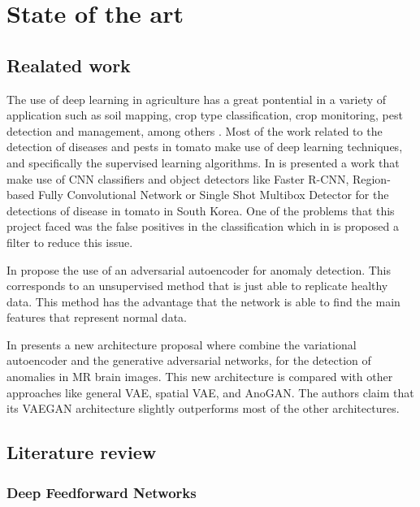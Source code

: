 \chapter{State of the art}
\label{ch:marco}

\section{Realated work}

The use of deep learning in agriculture has a great pontential in a variety of application such as soil mapping, crop type classification, crop monitoring, pest detection and management, among others \cite{Kamilaris}. Most of the work related to the detection of diseases and pests in tomato make use of deep learning techniques, and specifically the supervised learning algorithms. In \cite{Fuentes2017_2} is presented a work that make use of CNN classifiers and object detectors like Faster R-CNN, Region-based Fully Convolutional Network or Single Shot Multibox Detector for the detections of disease in tomato in South Korea. One of the problems that this project faced was the false positives in the classification which in \cite{Fuentes2018} is proposed a filter to reduce this issue.

In \cite{AsimeniaDimokranitou2017} propose the use of an adversarial autoencoder for anomaly detection. This corresponds to an unsupervised method that is just able to replicate healthy data. This method has the advantage that the network is able to find the main features that represent normal data.

In \cite{Baur2019} presents a new architecture proposal where combine the variational autoencoder and the generative adversarial networks, for the detection of anomalies in MR brain images. This new architecture is compared with other approaches like general VAE, spatial VAE, and AnoGAN. The authors claim that its VAEGAN architecture slightly outperforms most of the other architectures.

\section{Literature review}

\subsection{Deep Feedforward Networks}

